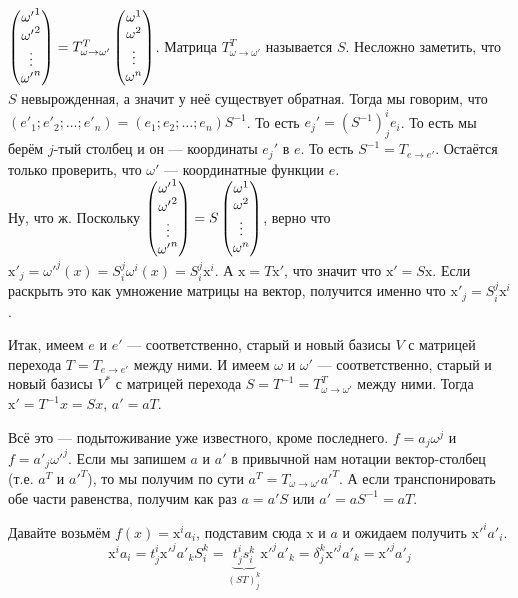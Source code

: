 \documentclass{article}
\begin{document}
\begin{itemize}
\begin{Proof}
            $\left(\begin{matrix}{\omega'}^1\\{\omega'}^2\\\vdots\\{\omega'}^n\end{matrix}\right)=T_{\omega\to\omega'}^T\left(\begin{matrix}{\omega}^1\\{\omega}^2\\\vdots\\{\omega}^n\end{matrix}\right)$. Матрица $T_{\omega\to\omega'}^T$ называется $S$. Несложно заметить, что $S$ невырожденная, а значит у неё существует обратная. Тогда мы говорим, что $({e'}_1;{e'}_2;\ldots;{e'}_n)=(e_1;e_2;\ldots;e_n)S^{-1}$. То есть $e_j'=(S^{-1})_j^ie_i$. То есть мы берём $j$-тый столбец и он --- координаты $e_j'$ в $e$. То есть $S^{-1}=T_{e\to e'}$. Остаётся только проверить, что $\omega'$ --- координатные функции $e$.\\
            Ну, что ж. Поскольку $\left(\begin{matrix}{\omega'}^1\\{\omega'}^2\\\vdots\\{\omega'}^n\end{matrix}\right)=S\left(\begin{matrix}{\omega}^1\\{\omega}^2\\\vdots\\{\omega}^n\end{matrix}\right)$, верно что $\mathrm x'_j={\omega'}^j(x)=S_i^j\omega^i(x)=S_i^j\mathrm x^i$. А $\mathrm x=T\mathrm x'$, что значит что $\mathrm x'=S\mathrm x$. Если раскрыть это как умножение матрицы на вектор, получится именно что $\mathrm x'_j=S_i^j\mathrm x^i$.
        \end{Proof}
        \thm Итак, имеем $e$ и $e'$ --- соответственно, старый и новый базисы $V$ с матрицей перехода $T=T_{e\to e'}$ между ними. И имеем $\omega$ и $\omega'$ --- соответственно, старый и новый базисы $V^*$ с матрицей перехода $S=T^{-1}=T_{\omega\to\omega'}^T$ между ними. Тогда $\mathrm x'=T^{-1}x=Sx$, $a'=aT$.
        \begin{Proof}
            Всё это --- подытоживание уже известного, кроме последнего. $f=a_j\omega^j$ и $f=a'_j{\omega'}^j$. Если мы запишем $a$ и $a'$ в привычной нам нотации вектор-столбец (т.е. $a^T$ и ${a'}^T$), то мы получим по сути $a^T=T_{\omega\to\omega'}{a'}^T$. А если транспонировать обе части равенства, получим как раз $a=a'S$ или $a'=aS^{-1}=aT$.
        \end{Proof}
        \begin{Comment}
            Давайте возьмём $f(x)=\mathrm x^ia_i$, подставим сюда $\mathrm x$ и $a$ и ожидаем получить ${\mathrm x'}^ia'_i$.\\
            $$
            \mathrm x^ia_i=t_j^i{\mathrm x'}^ja'_kS_i^k=\underbrace{t_j^is_i^k}_{(ST)_j^k}{\mathrm x'}^ja'_k=\delta_j^k{\mathrm x'}^ja'_k={\mathrm x'}^ja'_j
$$
\end{Comment}
\end{itemize}
\end{document}
